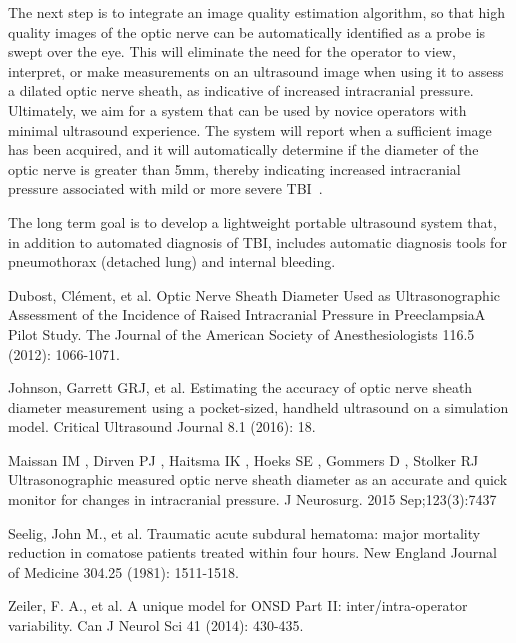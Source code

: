 \documentclass{llncs}
\begin{document}
The next step is to integrate an image quality estimation algorithm, so that
high quality images of the optic nerve can be automatically identified as a
probe is swept over the eye. This will eliminate the need for the operator to
view, interpret, or make measurements on an ultrasound image when using it to
assess a dilated optic nerve sheath, as indicative of increased intracranial
pressure. Ultimately, we aim for a system that can be used by novice operators
with minimal ultrasound experience. The system will report when a sufficient
image has been acquired, and it will automatically determine if the diameter of
the optic nerve is greater than 5mm, thereby indicating increased intracranial
pressure associated with mild or more severe TBI~\cite{Ma2015}.

The long term goal is to develop a lightweight portable ultrasound
system that, in addition to automated diagnosis of TBI, includes automatic
diagnosis tools for pneumothorax (detached lung) and internal bleeding.

%
%
\begin{thebibliography}{}
%
Dubost, Clément, et al. 
Optic Nerve Sheath Diameter Used as Ultrasonographic Assessment of the Incidence
of Raised Intracranial Pressure in PreeclampsiaA Pilot Study.  
The Journal of the American Society of Anesthesiologists 116.5 (2012): 1066-1071.

Johnson, Garrett GRJ, et al. 
Estimating the accuracy of optic nerve sheath diameter measurement using a
pocket-sized, handheld ultrasound on a simulation model.  Critical Ultrasound
Journal 8.1 (2016): 18.

Maissan IM , Dirven PJ , Haitsma IK , Hoeks SE , Gommers D , Stolker RJ 
Ultrasonographic measured optic nerve sheath diameter as an accurate and quick
monitor for changes in intracranial pressure. 
J Neurosurg. 2015 Sep;123(3):7437

Seelig, John M., et al. 
Traumatic acute subdural hematoma: major mortality reduction in comatose
patients treated within four hours.
New England Journal of Medicine 304.25 (1981): 1511-1518.

Zeiler, F. A., et al. 
A unique model for ONSD Part II: inter/intra-operator variability. 
Can J Neurol Sci 41 (2014): 430-435.


\end{thebibliography}
\end{document}
